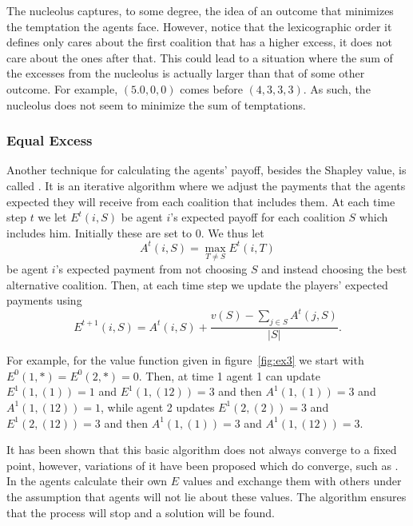 The nucleolus captures, to some degree, the idea of an outcome that
minimizes the temptation the agents face. However, notice that the
lexicographic order it defines only cares about the first coalition
that has a higher excess, it does not care about the ones after that.
This could lead to a situation where the sum of the excesses from the
nucleolus is actually larger than that of some other outcome. For
example, $(5.0,0,0)$ comes before $(4,3,3,3)$. As such, the nucleolus
does not seem to minimize the sum of temptations.

\subsubsection{Equal Excess}
\label{sec:equal-excess}

Another technique for calculating the agents' payoff, besides the
Shapley value, is called . It is an iterative
algorithm where we adjust the payments that the agents expected they
will receive from each coalition that includes them. At each time step
$t$ we let $E^t(i,S)$ be agent $i$'s expected payoff for each
coalition $S$ which includes him. Initially these are set to 0. We
thus let
\begin{equation}
  \label{eq:gt-9}
  A^t(i,S) = \max _{T \neq S} E^t(i,T)  
\end{equation}
be agent $i$'s expected payment from not choosing $S$ and instead
choosing the best alternative coalition. Then, at each time step we
update the players' expected payments using
\begin{equation}
  \label{eq:gt-10}
  E^{t+1}(i,S) = A^t(i,S) + \frac{v(S) - \sum_{j\in S} A^t(j,S)}{|S|}.
\end{equation}

For example, for the value function given in figure~\ref{fig:ex3} we
start with $E^0(1,*)=E^0(2,*)=0$. Then, at time 1 agent 1 can update
$E^1(1,(1)) = 1$ and $E^1(1,(12)) = 3$ and then $A^1(1,(1)) = 3$ and
$A^1(1,(12)) = 1$, while agent 2 updates $E^1(2,(2)) = 3$ and
$E^1(2,(12)) = 3$ and then $A^1(1,(1)) = 3$ and $A^1(1,(12)) = 3$.

It has been shown that this basic algorithm does not always converge
to a fixed point, however, variations of it have been proposed which
do converge, such as  \cite{goradia07b}. In  the
agents calculate their own $E$ values and exchange them with others
under the assumption that agents will not lie about these values. The
algorithm ensures that the process will stop and a solution will be
found.

